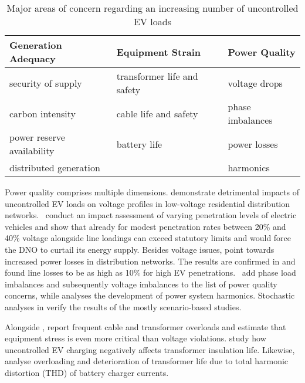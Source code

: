\begin{table}[]
	\centering
	\begin{tabular}{@{}lll@{}}
		\toprule
		\textbf{Generation Adequacy}    	& \textbf{Equipment Strain}            & \textbf{Power Quality}    \\ \midrule
		\tabitem security of supply     	& \tabitem transformer life and safety & \tabitem voltage drops    \\
		\tabitem carbon intensity       	& \tabitem cable life and safety       & \tabitem phase imbalances \\
		\tabitem power reserve availability & \tabitem battery life                & \tabitem power losses     \\
		\tabitem distributed generation 	&                                      & \tabitem harmonics        \\ \bottomrule
	\end{tabular}
	\caption{Major areas of concern regarding an increasing number of uncontrolled EV loads}
	\label{tab:concern}
\end{table}


Power quality comprises multiple dimensions. \cite{Boulanger2011,Wu2011,Pillai2010} demonstrate detrimental impacts of uncontrolled EV loads on voltage profiles in low-voltage residential distribution networks. \mbox{\cite{Richardson2010} conduct} an impact assessment of varying penetration levels of electric vehicles and show that already for modest penetration rates between 20\% and 40\%  voltage alongside line loadings can exceed statutory limits and would force the DNO to curtail its energy supply. Besides voltage issues, \cite{Clement-Nyns2010} point towards increased power losses in distribution networks. The results are confirmed in \cite{Paudyal2011} and \cite{Papadopoulos2012} found line losses to be as high as 10\% for high EV penetrations. \mbox{\cite{Putrus2009} add} phase load imbalances and subsequently voltage imbalances to the list of power quality concerns, while \cite{Koyanagi1999} analyses the development of power system harmonics. Stochastic analyses in \cite{Leou2013} verify the results of the mostly scenario-based studies.

Alongside \cite{Richardson2010}, \cite{Papadopoulos2012} report frequent cable and transformer overloads and estimate that equipment stress is even more critical than voltage violations. 
\cite{Gong2012} study how uncontrolled EV charging negatively affects transformer insulation life. Likewise, \cite{Gomez2002, Shao2009, Warweg2011} analyse overloading and deterioration of transformer life due to total harmonic distortion (THD) of battery charger currents.

